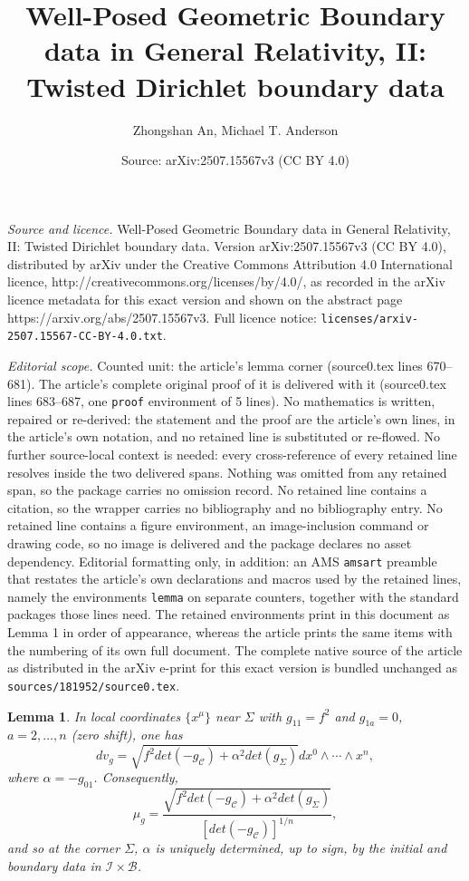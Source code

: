 \documentclass[10pt,a4paper]{amsart}
\title{Well-Posed Geometric Boundary data in General Relativity, II: Twisted Dirichlet boundary data}
\author{Zhongshan An, Michael T. Anderson}
\date{Source: arXiv:2507.15567v3 (CC BY 4.0)}
\newtheorem{lemma}{Lemma}
\newcommand{\Si}{\Sigma}
\renewcommand{\a}{\alpha}
\newcommand{\be}{\begin{equation}}
\newcommand{\cB}{{\mathcal B}}
\newcommand{\cC}{{\mathcal C}}
\newcommand{\cI}{\mathcal I}
\newcommand{\ee}{\end{equation}}
\begin{document}
\maketitle

\noindent\emph{Source and licence.} Well-Posed Geometric Boundary data in General Relativity, II: Twisted Dirichlet boundary data. Version arXiv:2507.15567v3 (CC BY 4.0), distributed by arXiv under the Creative Commons Attribution 4.0 International licence, http://creativecommons.org/licenses/by/4.0/, as recorded in the arXiv licence metadata for this exact version and shown on the abstract page https://arxiv.org/abs/2507.15567v3. Full licence notice: \texttt{licenses/arxiv-2507.15567-CC-BY-4.0.txt}.\par\smallskip

\noindent\textit{Editorial scope.} Counted unit: the article's lemma corner (source0.tex lines 670--681). The article's complete original proof of it is delivered with it (source0.tex lines 683--687, one \texttt{proof} environment of 5 lines). No mathematics is written, repaired or re-derived: the statement and the proof are the article's own lines, in the article's own notation, and no retained line is substituted or re-flowed.  No further source-local context is needed: every cross-reference of every retained line resolves inside the two delivered spans.  Nothing was omitted from any retained span, so the package carries no omission record.  No retained line contains a citation, so the wrapper carries no bibliography and no bibliography entry.  No retained line contains a figure environment, an image-inclusion command or drawing code, so no image is delivered and the package declares no asset dependency.  Editorial formatting only, in addition: an AMS \texttt{amsart} preamble that restates the article's own declarations and macros used by the retained lines, namely the environments \texttt{lemma} on separate counters, together with the standard packages those lines need.  The retained environments print in this document as Lemma 1 in order of appearance, whereas the article prints the same items with the numbering of its own full document.  The complete native source of the article as distributed in the arXiv e-print for this exact version is bundled unchanged as \texttt{sources/181952/source0.tex}.
\begin{lemma} \label{corner}
In local coordinates $\{x^{\mu}\}$ near $\Si$ with $g_{11} = f^2$ and $g_{1a} = 0$, $a = 2, \dots, n$ (zero shift), one has 
\be \label{dvg}
dv_g = \sqrt{f^2 det(-g_{\cC}) + \a^2 det(g_{\Si})} dx^0 \wedge \cdots \wedge x^n,
\ee
where $\a = -g_{01}$. Consequently, 
\be \label{mu1}
\mu_g = \frac{\sqrt{f^2 det(-g_{\cC}) + \a^2 det(g_{\Si})}}{[det(-g_{\cC})]^{1/n}},
\ee
and so at the corner $\Si$, $\a$ is uniquely determined, up to sign, by the initial and boundary data in $\cI \times \cB$. 

\end{lemma}
\end{document}
